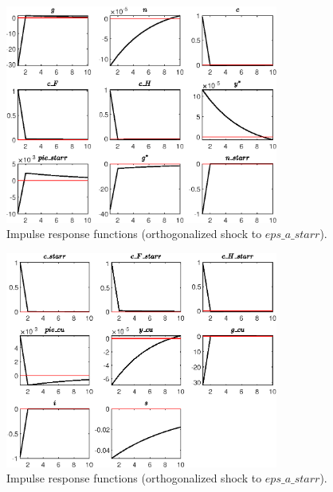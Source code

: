 \begin{figure}[H]
\centering 
\includegraphics[width=0.80\textwidth]{MODEL_MAIN/graphs/MODEL_MAIN_IRF_eps_a_starr3}
\caption{Impulse response functions (orthogonalized shock to $eps\_a\_starr$).}\label{Fig:IRF:eps_a_starr:3}
\end{figure}
 
\begin{figure}[H]
\centering 
\includegraphics[width=0.80\textwidth]{MODEL_MAIN/graphs/MODEL_MAIN_IRF_eps_a_starr4}
\caption{Impulse response functions (orthogonalized shock to $eps\_a\_starr$).}\label{Fig:IRF:eps_a_starr:4}
\end{figure}
 
 
